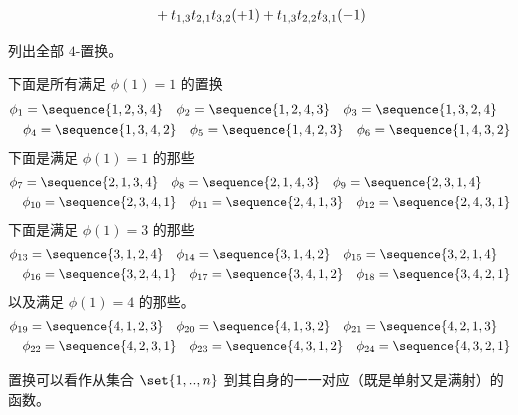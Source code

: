 \begin{exercises}
\begin{answer}
\begin{align*}
\begin{aligned}[t]
                 &\hbox{}\quad\hbox{}
                   +t_{1,3}t_{2,1}t_{3,2}(+1)
                         +t_{1,3}t_{2,2}t_{3,1}(-1)
               \end{aligned}
          \end{align*}
     \end{answer}
  \item
    列出全部 $4$-置换。
    \begin{answer}
      下面是所有满足 $\phi(1)=1$ 的置换
      \begin{align*}
        &\phi_1=\sequence{1,2,3,4}
        \quad
        \phi_2=\sequence{1,2,4,3}
        \quad
        \phi_3=\sequence{1,3,2,4}  \\
        &\quad
        \phi_4=\sequence{1,3,4,2}
        \quad
        \phi_5=\sequence{1,4,2,3}
        \quad
        \phi_6=\sequence{1,4,3,2}
      \end{align*}
      下面是满足 $\phi(1)=1$ 的那些
      \begin{align*}
        &\phi_7=\sequence{2,1,3,4}
        \quad
        \phi_8=\sequence{2,1,4,3}
        \quad
        \phi_9=\sequence{2,3,1,4}    \\
        &\quad
        \phi_{10}=\sequence{2,3,4,1}
        \quad
        \phi_{11}=\sequence{2,4,1,3}
        \quad
        \phi_{12}=\sequence{2,4,3,1}
      \end{align*}
      下面是满足 $\phi(1)=3$ 的那些
      \begin{align*}
        &\phi_{13}=\sequence{3,1,2,4}
        \quad
        \phi_{14}=\sequence{3,1,4,2}
        \quad
        \phi_{15}=\sequence{3,2,1,4}  \\
        &\quad
        \phi_{16}=\sequence{3,2,4,1}
        \quad
        \phi_{17}=\sequence{3,4,1,2}
        \quad
        \phi_{18}=\sequence{3,4,2,1}
      \end{align*}
      以及满足 $\phi(1)=4$ 的那些。
      \begin{align*}
        &\phi_{19}=\sequence{4,1,2,3}
        \quad
        \phi_{20}=\sequence{4,1,3,2}
        \quad
        \phi_{21}=\sequence{4,2,1,3}  \\
        &\quad
        \phi_{22}=\sequence{4,2,3,1}
        \quad
        \phi_{23}=\sequence{4,3,1,2}
        \quad
        \phi_{24}=\sequence{4,3,2,1}
      \end{align*}
    \end{answer}
  \item
    置换可以看作从集合
    $\set{1,..,n}$ 到其自身的一一对应（既是单射又是满射）的函数。

\end{exercises}
